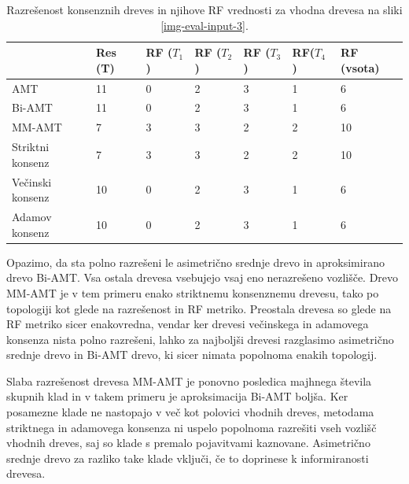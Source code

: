 \documentclass[a4paper, 12pt]{book}
\begin{document}
\begin{table}[h!]
	\begin{center}
	{\footnotesize
	\begin{tabular}{ l| l | l | l | l | l | l }
	~                & Res (T)      & RF ($T_1$) & RF ($T_2$)       & RF ($T_3$) & RF($T_4$) & RF (vsota) \\ \hline
	AMT              & 11          & 0          & 2                & 3          & 1         & 6          \\ \hline
	Bi-AMT           & 11          & 0          & 2                & 3          & 1         & 6          \\ \hline
	MM-AMT           & 7           & 3          & 3                & 2          & 2         & 10         \\ \hline
	Striktni konsenz & 7           & 3          & 3                & 2          & 2         & 10         \\ \hline
	Večinski konsenz & 10          & 0          & 2                & 3          & 1         & 6          \\ \hline
	Adamov konsenz   & 10          & 0          & 2                & 3          & 1         & 6          \\ \hline
	\end{tabular}
	\caption{Razrešenost konsenznih dreves in njihove RF vrednosti za vhodna drevesa na sliki \ref{img-eval-input-3}.}
	}
	\label{table-eval-3}
	\end{center}		
\end{table}

Opazimo, da sta polno razrešeni le asimetrično srednje drevo in aproksimirano drevo Bi-AMT. Vsa ostala drevesa vsebujejo vsaj eno nerazrešeno vozlišče. Drevo MM-AMT je v tem primeru enako striktnemu konsenznemu drevesu, tako po topologiji kot glede na razrešenost in RF metriko. Preostala drevesa so glede na RF metriko sicer enakovredna, vendar ker drevesi večinskega in adamovega konsenza nista polno razrešeni, lahko za najboljši drevesi razglasimo asimetrično srednje drevo in Bi-AMT drevo, ki sicer nimata popolnoma enakih topologij.

Slaba razrešenost drevesa MM-AMT je ponovno posledica majhnega števila skupnih klad in v takem primeru je aproksimacija Bi-AMT boljša. Ker posamezne klade ne nastopajo v več kot polovici vhodnih dreves, metodama striktnega in adamovega konsenza ni uspelo popolnoma razrešiti vseh vozlišč vhodnih dreves, saj so klade s premalo pojavitvami kaznovane. Asimetrično srednje drevo za razliko take klade vključi, če to doprinese k informiranosti drevesa.
\end{document}
